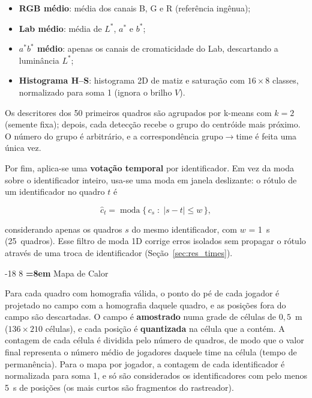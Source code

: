 \documentclass[12pt]{article}
\makeatletter
\renewcommand\subsection{\@startsection{subsection}{2}{\z@}%
                       {-18\p@ \@plus -4\p@ \@minus -4\p@}%
                       {8\p@ \@plus 4\p@ \@minus 4\p@}%
                       {\normalfont\normalsize\bfseries\boldmath
                        \rightskip=\z@ \@plus 8em\pretolerance=10000 }}
\makeatother
\begin{document}
\begin{itemize}
  \item \textbf{RGB médio}: média dos canais B, G e R (referência ingênua);
  \item \textbf{Lab médio}: média de $L^*$, $a^*$ e $b^*$;
  \item \textbf{$a^*b^*$ médio}: apenas os canais de cromaticidade do Lab, descartando
        a luminância $L^*$;
  \item \textbf{Histograma H--S}: histograma 2D de matiz e saturação com
        $16\times8$ classes, normalizado para soma 1 (ignora o brilho $V$).
\end{itemize}

Os descritores dos 50 primeiros quadros são agrupados por k-means com $k=2$
(semente fixa); depois, cada detecção recebe o grupo do centróide mais próximo. O
número do grupo é arbitrário, e a correspondência grupo$\rightarrow$time é feita uma
única vez.

Por fim, aplica-se uma \textbf{votação temporal} por identificador. Em vez da moda
sobre o identificador inteiro, usa-se uma moda em janela deslizante: o rótulo de um
identificador no quadro $t$ é

\begin{equation}
\hat{c}_t = \operatorname{moda}\{\, c_s \;:\; |s - t| \le w \,\},
\end{equation}

considerando apenas os quadros $s$ do mesmo identificador, com $w$ = 1~s
(25~quadros). Esse filtro de moda 1D corrige erros isolados sem propagar o rótulo
através de uma troca de identificador (Seção~\ref{sec:res_times}).

\subsection{Mapa de Calor}

Para cada quadro com homografia válida, o ponto do pé de cada jogador é projetado
no campo com a homografia daquele quadro, e as posições fora do campo são descartadas. O campo é
\textbf{amostrado} numa grade de células de $0{,}5$~m ($136\times210$ células), e cada
posição é \textbf{quantizada} na célula que a contém. A contagem de cada célula é
dividida pelo número de quadros, de modo que o valor final representa o número médio
de jogadores daquele time na célula (tempo de permanência). Para o mapa por jogador,
a contagem de cada identificador é normalizada para soma 1, e só são considerados os
identificadores com pelo menos 5~s de posições (os mais curtos são fragmentos do
rastreador).
\end{document}
